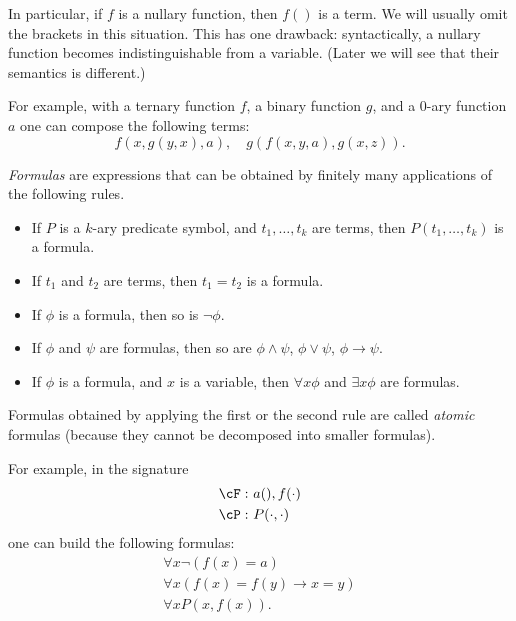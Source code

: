 \begin{page}
\setcounter{section}{1}
\setcounter{subsection}{1}
\setcounter{dfn}{2}
\label{portion:491}

In particular, if $f$ is a nullary function, then $f()$ is a term.
We will usually omit the brackets in this situation.
This has one drawback: syntactically, a nullary function becomes indistinguishable from a variable.
(Later we will see that their semantics is different.)

For example, with a ternary function $f$, a binary function $g$, and a $0$-ary function $a$ one can compose the following terms:
\[
f(x, g(y,x), a), \quad g(f(x,y,a), g(x,z)).
\]


\end{page}

\begin{page}
\setcounter{section}{1}
\setcounter{subsection}{1}
\setcounter{dfn}{3}
\label{portion:493}

\begin{dfn}
\emph{Formulas} are expressions that can be obtained by finitely many applications of the following rules.
\begin{itemize}
\item
If $P$ is a $k$-ary predicate symbol, and $t_1, \ldots, t_k$ are terms, then $P(t_1, \ldots, t_k)$ is a formula.
\item
If $t_1$ and $t_2$ are terms, then $t_1 = t_2$ is a formula.
\item
If $\phi$ is a formula, then so is $\neg \phi$.
\item
If $\phi$ and $\psi$ are formulas, then so are $\phi \wedge \psi$, $\phi \vee \psi$, $\phi \to \psi$.
\item
If $\phi$ is a formula, and $x$ is a variable, then $\forall x \phi$ and $\exists x \phi$ are formulas.
\end{itemize}
\end{dfn}

\end{page}

\begin{page}
\setcounter{section}{1}
\setcounter{subsection}{1}
\setcounter{dfn}{3}
\label{portion:494}

Formulas obtained by applying the first or the second rule are called \emph{atomic} formulas (because they cannot be decomposed into smaller formulas).

For example, in the signature
\begin{align*}
\cF:\ &a(), f(\cdot) \\
\cP:\ &P(\cdot, \cdot)
\end{align*}
one can build the following formulas:
\begin{gather*}
\forall x \neg(f(x) = a)\\
\forall x (f(x)=f(y) \to x=y)\\
\forall x P(x, f(x)).
\end{gather*}



\end{page}

